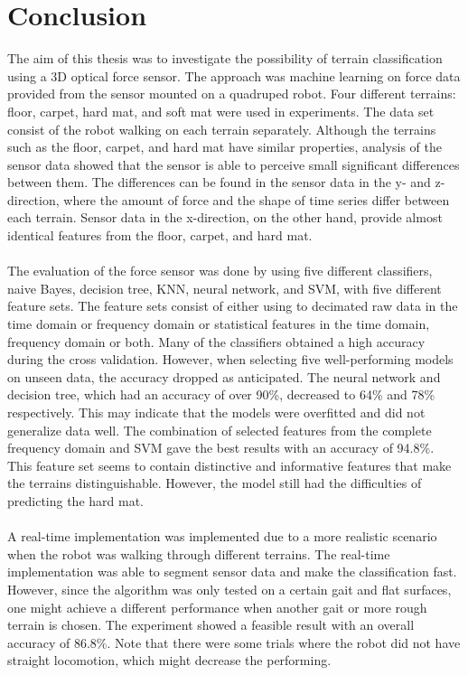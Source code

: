 \documentclass[USenglish]{ifimaster}  %
\begin{document}
\section{Conclusion}
The aim of this thesis was to investigate the possibility of terrain classification using a 3D optical force sensor. The approach was machine learning on force data provided from the sensor mounted on a quadruped robot. Four different terrains: floor, carpet, hard mat, and soft mat were used in experiments. The data set consist of the robot walking on each terrain separately. Although the terrains such as the floor, carpet, and hard mat have similar properties, analysis of the sensor data showed that the sensor is able to perceive small significant differences between them. The differences can be found in the sensor data in the y- and z-direction, where the amount of force and the shape of time series differ between each terrain. Sensor data in the x-direction, on the other hand, provide almost identical features from the floor, carpet, and hard mat.
\\
\\
The evaluation of the force sensor was done by using five different classifiers, naive Bayes, decision tree, KNN, neural network, and SVM, with five different feature sets. The feature sets consist of either using to decimated raw data in the time domain or frequency domain or statistical features in the time domain, frequency domain or both. Many of the classifiers obtained a high accuracy during the cross validation. However, when selecting five well-performing models on unseen data, the accuracy dropped as anticipated. The neural network and decision tree, which had an accuracy of over 90\%, decreased to 64\% and 78\% respectively. This may indicate that the models were overfitted and did not generalize data well. The combination of selected features from the complete frequency domain and SVM gave the best results with an accuracy of 94.8\%. This feature set seems to contain distinctive and informative features that make the terrains distinguishable. However, the model still had the difficulties of predicting the hard mat. 
\\
\\
A real-time implementation was implemented due to a more realistic scenario when the robot was walking through different terrains. The real-time implementation was able to segment sensor data and make the classification fast. However, since the algorithm was only tested on a certain gait and flat surfaces, one might achieve a different performance when another gait or more rough terrain is chosen. The experiment showed a feasible result with an overall accuracy of 86.8\%. Note that there were some trials where the robot did not have straight locomotion, which might decrease the performing.
\end{document}
